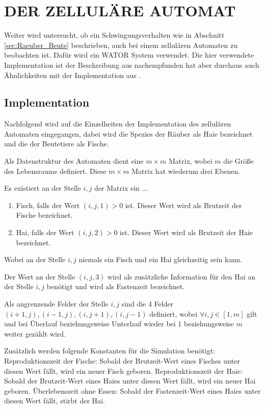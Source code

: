 \documentclass[a4paper,twoside]{article}
\begin{document}
	\section{\uppercase{Der zelluläre Automat}}
	
	Weiter wird untersucht, ob ein Schwingungsverhalten wie in Abschnitt \ref{sec:Raeuber_Beute} beschrieben, auch bei einem zellulären Automaten zu beobachten ist. Dafür wird ein WATOR System verwendet. Die hier verwendete Implementation ist der Beschreibung aus \cite{Wator} nachempfunden hat aber durchaus auch Ähnlichkeiten mit der Implementation aus \cite{PlanetWator}.	
	
	\subsection{Implementation}
	Nachfolgend wird auf die Einzelheiten der Implementation des zellulären Automaten eingegangen, dabei wird die Spezies der Räuber als Haie bezeichnet und die der Beutetiere als Fische.
	
	Als Datenstruktur des Automaten dient eine \(m \times m\) Matrix, wobei \(m\) die Größe des Lebensraums definiert. Diese \(m \times m\) Matrix hat wiederum drei Ebenen.
	
	Es existiert an der Stelle \(i,j\) der Matrix ein ...
	\begin{enumerate}[label=...]
		\item Fisch, falls der Wert \((i,j,1) > 0\) ist. Dieser Wert wird als Brutzeit der Fische bezeichnet.
		\item Hai, falls der Wert \((i,j,2) > 0\) ist. Dieser Wert wird als Brutzeit der Haie bezeichnet.
	\end{enumerate}
	Wobei an der Stelle \(i,j\) niemals ein Fisch und ein Hai gleichzeitig sein kann.

	Der Wert an der Stelle \((i,j,3)\) wird als zusätzliche Information für den Hai an der Stelle \(i,j\) benötigt und wird als Fastenzeit bezeichnet.

	Als angrenzende Felder der Stelle \(i,j\) sind die 4 Felder \((i+1,j), (i-1,j), (i,j+1), (i,j-1)\) definiert, wobei \( \forall i,j \in [1,m] \) gilt und bei Überlauf beziehungsweise Unterlauf wieder bei \(1\) beziehungsweise \(m\) weiter gezählt wird.
	
	Zusätzlich werden folgende Konstanten für die Simulation benötigt: \newline
	Reproduktionszeit der Fische: Sobald der Brutzeit-Wert eines Fisches unter diesen Wert fällt, wird ein neuer Fisch geboren. \newline
	Reproduktionszeit der Haie: Sobald der Brutzeit-Wert eines Haies unter diesen Wert fällt, wird ein neuer Hai geboren. \newline
	Überlebenszeit ohne Essen: Sobald der Fastenzeit-Wert eines Haies unter diesen Wert fällt, stirbt der Hai.
	
\end{document}
